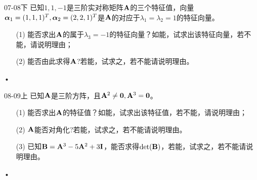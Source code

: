 \begin{frame} 
  \begin{footnotesize}
 


 \begin{exampleblock}{07-08下}     
     已知$1,1,-1$是三阶实对称矩阵$\mathbf{A}$的三个特征值，向量$\boldsymbol{\alpha}_1=(1,1,1)^T,\boldsymbol{\alpha}_2=(2,2,1)^T$是$\mathbf{A}$的对应于$\lambda_1=\lambda_2=1$的特征向量。
\begin{itemize}
\item[(1)] 能否求出$\mathbf{A}$的属于$\lambda_3=-1$的特征向量？如能，试求出该特征向量，若不能，请说明理由；
\item[(2)]能否由此求得$\mathbf{A}$?若能，试求之，若不能请说明理由。

\end{itemize}•
    \end{exampleblock}



 \begin{exampleblock}{08-09上}     
     已知$\mathbf{A}$是三阶方阵，且$\mathbf{A}^2\ne \mathbf{0}, \mathbf{A}^3=\mathbf{0}$。
\begin{itemize}
\item[(1)] 能否求出$\mathbf{A}$的特征值？如能，试求出该特征值，若不能，请说明理由；
\item[(2)] $\mathbf{A}$能否对角化?若能，试求之，若不能请说明理由。
\item[(3)] 已知$\mathbf{B}=\mathbf{A}^3-5\mathbf{A}^2+3\mathbf{I}$，能否求得$\det(\mathbf{B})$，若能，试求之，若不能请说明理由。

\end{itemize}•
    \end{exampleblock}



  \end{footnotesize}
\end{frame}



